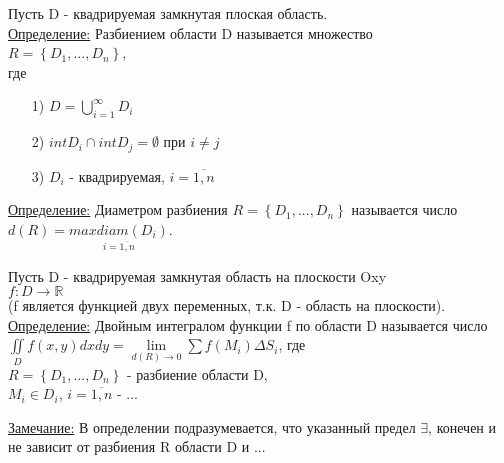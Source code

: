 
Пусть D - квадрируемая замкнутая плоская область. \\

\underline{Определение:} Разбиением области D называется множество \\
$R = \left\{D_1, ... , D_n\right\}$, \\
где \\
\begin{enumerate}
\item[1)] 
$D = \bigcup\limits_{i = 1}^{\infty} D_i$

\item[2)]
$int D_i \cap int D_j = \emptyset$ при $i \neq j$ 

\item[3)] 
$D_i$ - квадрируемая, $i = \overline{1,n}$
\end{enumerate}

\underline{Определение:} Диаметром разбиения $R = \left\{D_1, ..., D_n\right\}$ называется число $d(R) = \underset{i = \overline{1,n}}{max diam (D_i)}$. 

Пусть D - квадрируемая замкнутая область на плоскости Oxy \\
$f: D \rightarrow \mathbb{R}$ \\
(f является функцией двух переменных, т.к. D - область на плоскости). \\

\underline{Определение:} Двойным интегралом функции f по области D называется число \\
$\iint\limits_{D} f(x,y)dxdy = \lim\limits_{d(R) \rightarrow 0} \sum f(M_i)\Delta S_i$, где \\
$R = \left\{D_1, ... , D_n\right\}$ - разбиение области D, \\
$M_i \in D_i$, $i = \overline{1,n}$ - ...

\underline{Замечание:} В определении подразумевается, что указанный предел $\exists$, конечен и не зависит от разбиения R области D и ...


